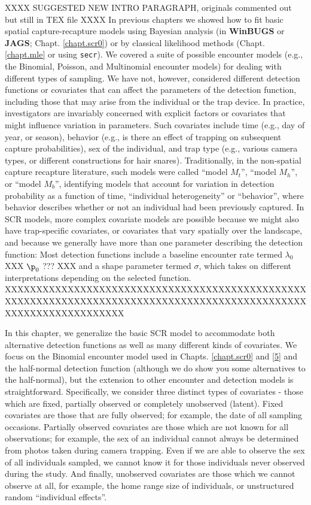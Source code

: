 XXXX SUGGESTED NEW INTRO PARAGRAPH, originals commented out but still in TEX file XXXX
In previous chapters we showed how to fit basic spatial
capture-recapture models using Bayesian analysis (in {\bf WinBUGS} or
{\bf JAGS};
Chapt. \ref{chapt.scr0}) or by classical likelihood methods
(Chapt. \ref{chapt.mle} or using \mbox{\tt secr}). We covered a suite of possible encounter models
(e.g., the Binomial, Poisson, and Multinomial encounter models) for
dealing with different types of sampling. We have not, however,
considered different detection functions or covariates that can affect
the parameters of the detection function, including those that may
arise from the individual or the trap device. In practice, investigators are invariably concerned
with explicit factors or covariates that might influence variation in
parameters. Such covariates
include time (e.g., day of year, or season), behavior (e.g., is there an effect of trapping on subsequent capture probabilities), sex of the individual, and trap
type (e.g., various camera types, or different constructions for hair
snares). Traditionally, in the non-spatial capture recapture
literature, such models were called ``model $M_t$'', ``model
$M_h$'', or ``model $M_b$'', identifying models that account for
variation in detection probability as a function of time, ``individual
heterogeneity'' or ``behavior'', where behavior describes
whether or not an individual had been previously captured. In SCR
models, more complex covariate models are possible because we might
also have trap-specific covariates, or covariates that vary spatially
over the landscape, and because we generally have more than one parameter describing the detection function:
Most detection functions include a baseline encounter
rate termed $\lambda_0$ XXX $\p_0$ ??? XXX and a shape parameter
termed $\sigma$, which takes on different interpretations depending on
the selected function. 
XXXXXXXXXXXXXXXXXXXXXXXXXXXXXXXXXXXXXXXXXXXXXXXXXXXXXXXXXXXXXXXXXXXXXXXXXXXXXXXXXXXXXXXXXXXXXXXXXXXXXXXXXXXXXXXXXXX

In this chapter, we generalize the basic SCR model to accommodate both alternative detection functions as well as
many different kinds of covariates. We focus on the Binomial encounter
model used in Chapts. \ref{chapt.scr0} and \ref{5} and the half-normal detection function (although we do show you some alternatives to the half-normal),
but the extension to other encounter and detection models is
straightforward.  Specifically, we consider three distinct types of
covariates - those which are fixed, partially observed or completely
unobserved (latent).  Fixed covariates are those that are fully
observed; for example, the date of all sampling occasions.  Partially
observed covariates are those which are not known for all
observations; for example, the sex of an individual cannot always be
determined from photos taken during camera trapping.  Even if we are
able to observe the sex of all individuals sampled, we cannot know it
for those individuals never observed during the study.  And finally,
unobserved covariates are those which we cannot observe at all, for
example, the home range size of individuals, or unstructured random
``individual effects''.


